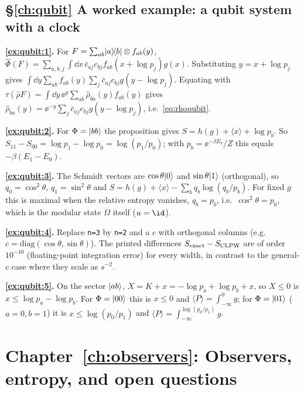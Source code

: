 {\subsection*{\S\ref{ch:qubit} A worked example: a qubit system with a clock}
\textbf{\ref{ex:qubit:1}.} For $F=\sum_{ab}\lvert a\rangle\!\langle b\rvert\otimes f_{ab}(y)$, $\hat\Phi(F)=\sum_{a,b,j}\int\dd x\,\bar c_{aj}c_{bj}f_{ab}(x+\log p_j)g(x)$. Substituting $y=x+\log p_j$ gives $\int\dd y\sum_{ab}f_{ab}(y)\sum_j\bar c_{aj}c_{bj}g(y-\log p_j)$. Equating with $\tau(\hat\rho F)=\int\dd y\,\ee^y\sum_{ab}\hat\rho_{ba}(y)f_{ab}(y)$ gives $\hat\rho_{ba}(y)=\ee^{-y}\sum_j\bar c_{aj}c_{bj}g(y-\log p_j)$, i.e.\ \eqref{eq:rhoqubit}.\par
\textbf{\ref{ex:qubit:2}.} For $\Phi=\lvert bb\rangle$ the proposition gives $S=h(g)+\langle x\rangle+\log p_b$. So $S_{11}-S_{00}=\log p_1-\log p_0=\log(p_1/p_0)$; with $p_b=\ee^{-\beta E_b}/Z$ this equals $-\beta(E_1-E_0)$.\par
\textbf{\ref{ex:qubit:3}.} The Schmidt vectors are $\cos\theta\lvert 0\rangle$ and $\sin\theta\lvert 1\rangle$ (orthogonal), so $q_0=\cos^2\theta$, $q_1=\sin^2\theta$ and $S=h(g)+\langle x\rangle-\sum_bq_b\log(q_b/p_b)$. For fixed $g$ this is maximal when the relative entropy vanishes, $q_b=p_b$, i.e.\ $\cos^2\theta=p_0$, which is the modular state $\Omega$ itself ($u=\id$).\par
\textbf{\ref{ex:qubit:4}.} Replace \texttt{n=3} by \texttt{n=2} and a $c$ with orthogonal columns (e.g.\ $c=\mathrm{diag}(\cos\theta,\sin\theta)$). The printed differences $S_{\rm exact}-S_{\rm CLPW}$ are of order $10^{-10}$ (floating-point integration error) for every width, in contrast to the general-$c$ case where they scale as $s^{-2}$.\par
\textbf{\ref{ex:qubit:5}.} On the sector $\lvert ab\rangle$, $X=K+x=-\log p_a+\log p_b+x$, so $X\le0$ is $x\le\log p_a-\log p_b$. For $\Phi=\lvert 00\rangle$ this is $x\le0$ and $\langle P\rangle=\int_{-\infty}^0g$; for $\Phi=\lvert 01\rangle$ ($a=0,b=1$) it is $x\le\log(p_0/p_1)$ and $\langle P\rangle=\int_{-\infty}^{\log(p_0/p_1)}g$.\par

\section*{Chapter~\ref{ch:observers}: Observers, entropy, and open questions}

}
